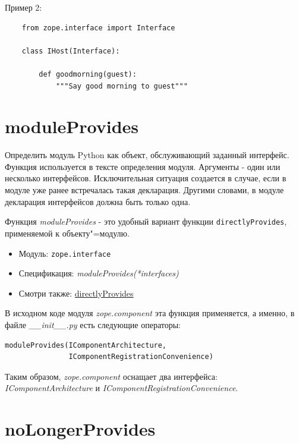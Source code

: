 \documentclass[a4paper,openany,twoside,draft]{book}
\providecommand*{\DUroletitlereference}[1]{\textsl{#1}}
\begin{document}
Пример 2:

\begin{verbatim}
    from zope.interface import Interface

    class IHost(Interface):

        def goodmorning(guest):
            """Say good morning to guest"""
\end{verbatim}


\section*{moduleProvides%
  \label{moduleprovides}%
}

Определить модуль Python как объект, обслуживающий заданный интерфейс.  Функция используется в тексте определения модуля.  Аргументы - один или несколько интерфейсов.  Исключительная ситуация создается в случае, если в модуле уже ранее встречалась такая декларация.  Другими словами, в модуле декларация интерфейсов должна быть только одна.

Функция \DUroletitlereference{moduleProvides} - это удобный вариант функции \texttt{directlyProvides}, применяемой к объекту"=модулю.

\begin{itemize}

\item Модуль: \texttt{zope.interface}

\item Спецификация: \DUroletitlereference{moduleProvides(*interfaces)}

\item Смотри также: \hyperref[directlyprovides]{directlyProvides}

\end{itemize}

В исходном коде модуля \DUroletitlereference{zope.component} эта функция применяется, а именно, в файле \DUroletitlereference{\_\_init\_\_.py} есть следующие операторы:

\begin{verbatim}
moduleProvides(IComponentArchitecture,
               IComponentRegistrationConvenience)
\end{verbatim}

Таким образом, \DUroletitlereference{zope.component} оснащает два интерфейса: \DUroletitlereference{IComponentArchitecture} и \DUroletitlereference{IComponentRegistrationConvenience}.


\section*{noLongerProvides%
  \label{nolongerprovides}%
}
\end{document}
